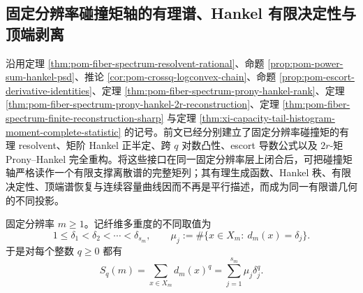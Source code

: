 \subsection{固定分辨率碰撞矩轴的有理谱、Hankel 有限决定性与顶端剥离}\label{subsec:conclusion-fixedresolution-collision-hankel-prony-spectrum}
沿用定理 \ref{thm:pom-fiber-spectrum-resolvent-rational}、命题 \ref{prop:pom-power-sum-hankel-psd}、推论 \ref{cor:pom-crossq-logconvex-chain}、命题 \ref{prop:pom-escort-derivative-identities}、定理 \ref{thm:pom-fiber-spectrum-prony-hankel-rank}、定理 \ref{thm:pom-fiber-spectrum-prony-hankel-2r-reconstruction}、定理 \ref{thm:pom-fiber-spectrum-finite-reconstruction-sharp} 与定理 \ref{thm:xi-capacity-tail-histogram-moment-complete-statistic} 的记号。前文已经分别建立了固定分辨率碰撞矩的有理 resolvent、矩阶 Hankel 正半定、跨 \(q\) 对数凸性、escort 导数公式以及 \(2r\)-矩 Prony--Hankel 完全重构。将这些接口在同一固定分辨率层上闭合后，可把碰撞矩轴严格读作一个有限支撑离散谱的完整矩列；其有理生成函数、Hankel 秩、有限决定性、顶端谱恢复与连续容量曲线因而不再是平行描述，而成为同一有限谱几何的不同投影。

固定分辨率 \(m\ge 1\)。记纤维多重度的不同取值为
\[
1\le \delta_1<\delta_2<\cdots<\delta_{s_m},
\qquad
\mu_j:=\#\{x\in X_m:\ d_m(x)=\delta_j\}.
\]
于是对每个整数 \(q\ge 0\) 都有
\[
S_q(m)=\sum_{x\in X_m}d_m(x)^q=\sum_{j=1}^{s_m}\mu_j\delta_j^q.
\]


